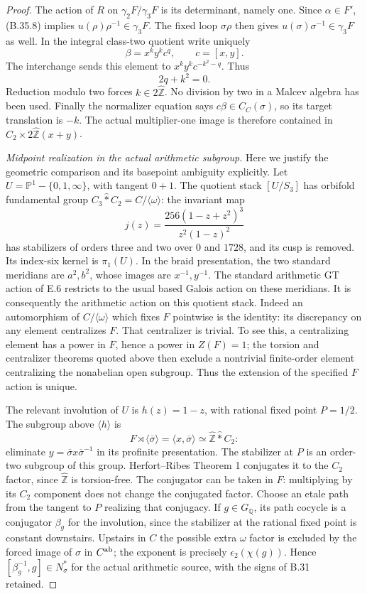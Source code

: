 \begin{proof}
The action of $R$ on $\gamma_2F/\gamma_3F$ is its determinant,
namely one.  Since $\alpha\in F'$, (B.35.8) implies
$u(\rho)\rho^{-1}\in\gamma_3F$.  The fixed loop $\sigma\rho$
then gives $u(\sigma)\sigma^{-1}\in\gamma_3F$ as well.
In the integral class-two quotient write uniquely
\[
             \beta=x^k y^k c^q,\qquad c=[x,y].
\]
The interchange sends this element to
$x^k y^k c^{-k^2-q}$.  Thus
\[
                        2q+k^2=0.
                                                        \tag{B.35.9}
\]
Reduction modulo two forces $k\in2\widehat{\mathbb Z}$.
No division by two in a Malcev algebra has been used.
Finally the normalizer equation says $c\beta\in C_C(\sigma)$,
so its target translation is $-k$.  The actual multiplier-one
image is therefore contained in
$C_2\times2\widehat{\mathbb Z}(x+y)$.

\emph{Midpoint realization in the actual arithmetic subgroup.}
Here we justify the geometric comparison and its basepoint
ambiguity explicitly.  Let $U=\mathbb P^1-\{0,1,\infty\}$,
with tangent $0+1$.  The quotient stack $[U/S_3]$ has orbifold
fundamental group $C_3\widehat *C_2=C/\langle\omega\rangle$:
the invariant map
\[
               j(z)=\frac{256(1-z+z^2)^3}{z^2(1-z)^2}
\]
has stabilizers of orders three and two over $0$ and $1728$,
and its cusp is removed.  Its index-six kernel is $\pi_1(U)$.
In the braid presentation, the two standard meridians are
$a^2,b^2$, whose images are $x^{-1},y^{-1}$.
The standard arithmetic GT action of E.6 restricts to the usual
based Galois action on these meridians.  It is consequently the
arithmetic action on this quotient stack.  Indeed an automorphism
of $C/\langle\omega\rangle$ which fixes $F$ pointwise is the
identity: its discrepancy on any element centralizes $F$.
That centralizer is trivial.  To see this, a centralizing element
has a power in $F$, hence a power in $Z(F)=1$; the torsion and
centralizer theorems quoted above then exclude a nontrivial
finite-order element centralizing the nonabelian open subgroup.
Thus the extension of the specified $F$ action is unique.

The relevant involution of $U$ is $h(z)=1-z$, with rational
fixed point $P=1/2$.  The subgroup above $\langle h\rangle$ is
\[
 F\rtimes\langle\overline\sigma\rangle
     =\langle x,\overline\sigma\rangle
     \simeq\widehat{\mathbb Z}\widehat *C_2:
\]
eliminate $y=\overline\sigma x\overline\sigma^{-1}$ in its
profinite presentation.  The stabilizer at $P$ is an order-two
subgroup of this group.  Herfort--Ribes Theorem 1 conjugates
it to the $C_2$ factor, since $\widehat{\mathbb Z}$ is
torsion-free.  The conjugator can be taken in $F$: multiplying
by its $C_2$ component does not change the conjugated factor.
Choose an etale path from the tangent to $P$ realizing that
conjugacy.  If $g\in G_\mathbb Q$, its path cocycle is a
conjugator $\beta_g$ for the involution, since the stabilizer
at the rational fixed point is constant downstairs.
Upstairs in $C$ the possible extra $\omega$ factor is excluded
by the forced image of $\sigma$ in $C^{\rm ab}$; the exponent
is precisely $\epsilon_2(\chi(g))$.  Hence
$[\beta_g^{-1},g]\in N_\sigma^*$ for the actual arithmetic
source, with the signs of B.31 retained.


\end{proof}
